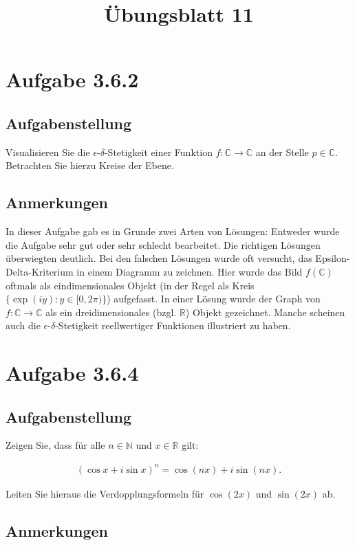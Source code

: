 \documentclass[a4paper]{article}
\title{Übungsblatt 11}
\date{}
\author{}
\newcommand*{\R}{\mathbb R}
\newcommand*{\N}{\mathbb N}
\newcommand*{\C}{\mathbb C}
\begin{document}
\maketitle

\section{Aufgabe 3.6.2}

\subsection{Aufgabenstellung}

Visualisieren Sie die $\epsilon$-$\delta$-Stetigkeit einer Funktion $f:\C\to\C$ an der Stelle $p\in \C$. Betrachten Sie hierzu Kreise der Ebene.

\subsection{Anmerkungen}

In dieser Aufgabe gab es in Grunde zwei Arten von Lösungen: Entweder wurde die Aufgabe sehr gut oder sehr schlecht bearbeitet. Die richtigen Lösungen überwiegten deutlich. Bei den falschen Lösungen wurde oft versucht, das Epsilon-Delta-Kriterium in einem Diagramm zu zeichnen. Hier wurde das Bild $f(\C)$ oftmals als eindimensionales Objekt (in der Regel als Kreis $\{\exp(iy): y\in[0,2\pi)\}$) aufgefasst. In einer Lösung wurde der Graph von $f:\C\to\C$ als ein dreidimensionales (bzgl. $\R$) Objekt gezeichnet. Manche scheinen auch die $\epsilon$-$\delta$-Stetigkeit reellwertiger Funktionen illustriert zu haben.

\section{Aufgabe 3.6.4}

\subsection{Aufgabenstellung}

Zeigen Sie, dass für alle $n\in\N$ und $x\in\R$ gilt:

\begin{align}
  (\cos x+i\sin x)^n = \cos(nx)+i\sin(nx).
\end{align}

Leiten Sie hieraus die Verdopplungsformeln für $\cos(2x)$ und $\sin(2x)$ ab.

\subsection{Anmerkungen}
\end{document}
